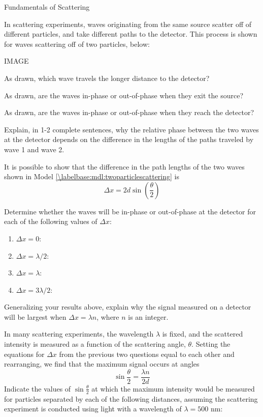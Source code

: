 \begin{activity}{Fundamentals of Scattering}
\begin{model}
\label{\labelbase:mdl:twoparticlescattering}
	
	In scattering experiments, waves originating from the same source scatter off of different particles, and take different paths to the detector.  This process is shown for waves scattering off of two particles, below:
	
	IMAGE
	
\end{model}

\begin{ctqs}

	\question As drawn, which wave travels the longer distance to the detector?
	
	\question As drawn, are the waves in-phase or out-of-phase when they exit the source?
	
	\question As drawn, are the waves in-phase or out-of-phase when they reach the detector?
	
	\question Explain, in 1-2 complete sentences, why the relative phase between the two waves at the detector depends on the difference in the lengths of the paths traveled by wave 1 and wave 2.
	
	\question It is possible to show %
		that the difference in the path lengths of the two waves shown in Model \ref{\labelbase:mdl:twoparticlescattering} is
		\begin{equation*}
			\Delta x = 2 d \sin\left(\frac{\theta}{2}\right)
		\end{equation*}
		
		Determine whether the waves will be in-phase or out-of-phase at the detector for each of the following values of $\Delta x$:
		
		\begin{enumerate}
			\item $\Delta x = 0$:
			\item $\Delta x = \lambda/2$:
			\item $\Delta x = \lambda$:
			\item $\Delta x = 3\lambda/2$:
		\end{enumerate}
		
	\question Generalizing your results above, explain why the signal measured on a detector will be largest when $\Delta x = \lambda n$, where $n$ is an integer.
	
	\question In many scattering experiments, the wavelength $\lambda$ is fixed, and the scattered intensity is measured as a function of the scattering angle, $\theta$.  Setting the equations for $\Delta x$ from the previous two questions equal to each other and rearranging, we find that the maximum signal occurs at angles
		\begin{equation*}
			\sin \frac{\theta}{2} = \frac{\lambda n}{2d}
		\end{equation*}
		Indicate the values of $\sin\frac{\theta}{2}$ at which the maximum intensity would be measured for particles separated by each of the following distances, assuming the scattering experiment is conducted using light with a wavelength of $\lambda=500\text{ nm}$:
		

\end{ctqs}
\end{activity}
